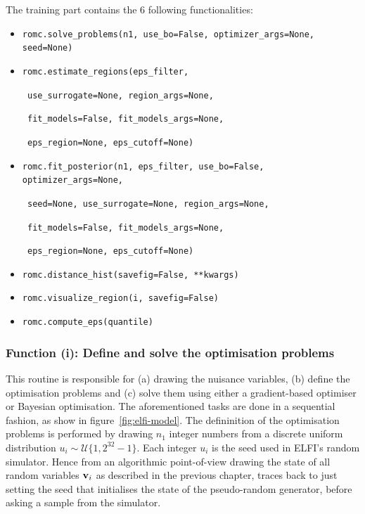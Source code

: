 The training part contains the 6 following functionalities:

\begin{itemize}
\item \texttt{romc.solve_problems(n1, use_bo=False, optimizer_args=None, seed=None)}
\item \texttt{romc.estimate_regions(eps_filter,}
  
      \texttt{                      use_surrogate=None, region_args=None,}
  
      \texttt{                      fit_models=False, fit_models_args=None,}
  
      \texttt{                      eps_region=None, eps_cutoff=None)}
      
    \item \texttt{romc.fit_posterior(n1, eps_filter, use_bo=False, optimizer_args=None,}
  
          \texttt{                   seed=None, use_surrogate=None, region_args=None,}
  
          \texttt{                   fit_models=False, fit_models_args=None,}
  
          \texttt{                   eps_region=None, eps_cutoff=None)}

\item \texttt{romc.distance_hist(savefig=False, **kwargs)}
\item \texttt{romc.visualize_region(i, savefig=False)}
\item \texttt{romc.compute_eps(quantile)}
\end{itemize}


\subsubsection*{Function (i): Define and solve the optimisation problems}

\vspace{5mm}

\noindent
This routine is responsible for (a) drawing the nuisance variables,
(b) define the optimisation problems and (c) solve them using either a
gradient-based optimiser or Bayesian optimisation. The aforementioned
tasks are done in a sequential fashion, as show in
figure~\ref{fig:elfi-model}. The defininition of the optimisation
problems is performed by drawing $n_1$ integer numbers from a discrete
uniform distribution $u_i \sim \mathcal{U}\{1, 2^{32}-1\}$. Each
integer $u_i$ is the seed used in ELFI's random simulator. Hence from
an algorithmic point-of-view drawing the state of all random
variables $\mathbf{v}_i$ as described in the previous chapter, traces back to
just setting the seed that initialises the state of the pseudo-random
generator, before asking a sample from the simulator.

